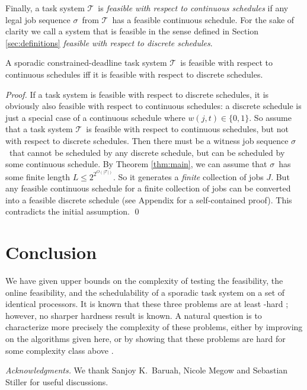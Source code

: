 \documentclass{llncs}
\newcommand{\tsys}{\ensuremath{\mathcal{T}}}
\newcommand{\seq}{\ensuremath{\sigma}}
\newcommand{\conp}{\ccconp}
\begin{document}
Finally, a task system \tsys\ is \emph{feasible with respect to continuous schedules} if any legal job sequence \seq\ from \tsys\ has a feasible continuous schedule. For the sake of clarity we call a system that is feasible in the sense defined in Section \ref{sec:definitions} \emph{feasible with respect to discrete schedules}. 

\begin{theorem}
\label{thm:continuous}
A sporadic constrained-deadline task system \tsys\ is feasible with respect to continuous schedules iff it is feasible with respect to discrete schedules. 
\end{theorem}
\begin{proof}
If a task system is feasible with respect to discrete schedules, it is obviously also feasible with respect to continuous schedules: a discrete schedule is just a special case of a continuous schedule where $w(j,t) \in \{0,1\}$. So assume that a task system \tsys\ is feasible with respect to continuous schedules, but not with respect to discrete schedules. Then there must be a witness job sequence \seq\ that cannot be scheduled by any discrete schedule, but can be scheduled by some continuous schedule. By Theorem \ref{thm:main}, we can assume that \seq\ has some finite length $L \le 2^{2^{O(|\tsys|)}}$. So it generates a \emph{finite} collection of jobs $J$. But any feasible continuous schedule for a finite collection of jobs can be converted into a feasible discrete schedule \cite{Baruah:1996,Baruah:1990,Horn:1974} (see Appendix for a self-contained proof). This contradicts the initial assumption. 
\qed
\end{proof}


\section{Conclusion}
\label{sec:conclusion}
We have given upper bounds on the complexity of testing the feasibility, the online feasibility, and the schedulability of a sporadic task system on a set of identical processors. It is known that these three problems are at least \conp-hard \cite{Eisenbrand:2010}; however, no sharper hardness result is known. A natural question is to characterize more precisely the complexity of these problems, either by improving on the algorithms given here, or by showing that these problems are hard for some complexity class above \conp. 



\emph{Acknowledgments.}
We thank Sanjoy K.\ Baruah, Nicole Megow and Sebastian Stiller for useful discussions. 
\vspace{-0.3cm}
\end{document}
